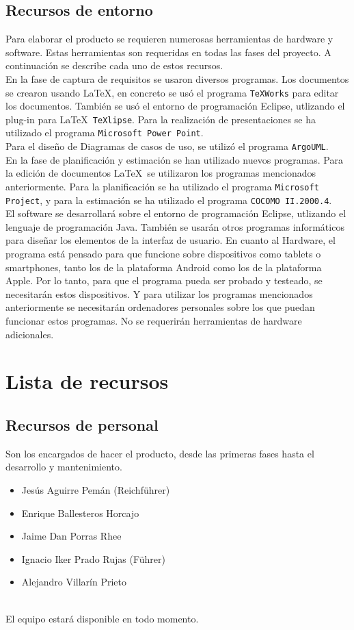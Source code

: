 \documentclass[spanish,a4paper,11pt, twoside]{report}	%
\begin{document}
		\subsection{Recursos de entorno}
			Para elaborar el producto se requieren numerosas herramientas de hardware y
			software. Estas herramientas son requeridas en todas las fases del proyecto. 
			A continuación se describe cada uno de estos recursos.  \\
			En la fase de captura de requisitos se usaron diversos programas. Los documentos
			se crearon usando \LaTeX , en concreto se usó el programa \texttt{TeXWorks} para editar los documentos.
			También se usó el entorno de programación Eclipse, utlizando el plug-in para \LaTeX\  \texttt{TeXlipse}. 
			Para la realización de presentaciones se ha utilizado el programa \texttt{Microsoft Power Point}.\\
			Para el diseño de Diagramas de casos de uso, se utilizó el programa \texttt{ArgoUML}.\\
			En la fase de planificación y estimación se han utilizado nuevos programas. Para la edición de documentos
			\LaTeX  \ se utilizaron los programas mencionados anteriormente. Para la planificación se ha utilizado el programa
			\texttt{Microsoft Project}, y para la estimación se ha utilizado el programa \texttt{COCOMO II.2000.4}.\\ 
			El software se desarrollará sobre el entorno de
			programación Eclipse, utlizando el lenguaje de programación Java. También se
			usarán otros programas informáticos para diseñar los elementos de la interfaz de
			usuario. En cuanto al Hardware, el programa está pensado para que funcione sobre dispositivos como
			tablets o smartphones, tanto los de la plataforma Android como los de la
			plataforma Apple. Por lo tanto, para que el programa pueda ser probado y
			testeado, se necesitarán estos dispositivos. Y para utilizar los programas mencionados anteriormente
			se necesitarán ordenadores personales sobre los que puedan funcionar estos programas.
			No se requerirán herramientas de
			hardware adicionales.


	\section{Lista de recursos}
		\subsection*{Recursos de personal}
			Son los encargados de hacer el producto, desde las primeras fases hasta el desarrollo y mantenimiento.\\
			\begin{itemize}
			  \item Jesús Aguirre Pemán (Reichführer)
			  \item Enrique Ballesteros Horcajo
			  \item Jaime Dan Porras Rhee
			  \item Ignacio Iker Prado Rujas (Führer)
			  \item Alejandro Villarín Prieto
			\end{itemize}\ \\
			El equipo estará disponible en todo momento.
\end{document}
